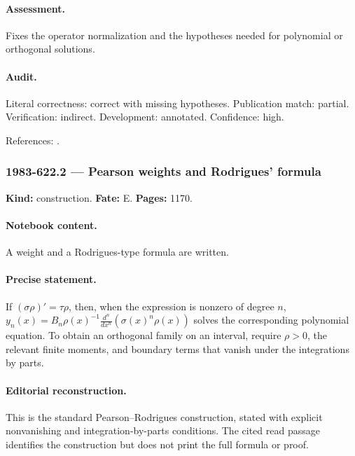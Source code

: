 \paragraph{Assessment.} Fixes the operator normalization and the hypotheses needed for polynomial or orthogonal solutions.

\paragraph{Audit.} Literal correctness: correct with missing hypotheses. Publication match: partial. Verification: indirect. Development: annotated. Confidence: high.

\noindent References: \citep{nikiforovsuslovuvarov1991classical}.\par

\subsubsection{1983-622.2 --- Pearson weights and Rodrigues’ formula}

\label{item:1983-622.2}

\noindent\textbf{Kind:} construction. \textbf{Fate:} E. \textbf{Pages:} 1170.\par

\paragraph{Notebook content.} A weight and a Rodrigues-type formula are written.

\paragraph{Precise statement.} If \((\sigma\rho)'=\tau\rho\), then, when the expression is nonzero of degree \(n\), \(y_n(x)=B_n\rho(x)^{-1}\frac{d^n}{dx^n}(\sigma(x)^n\rho(x))\) solves the corresponding polynomial equation. To obtain an orthogonal family on an interval, require \(\rho>0\), the relevant finite moments, and boundary terms that vanish under the integrations by parts.

\paragraph{Editorial reconstruction.} This is the standard Pearson–Rodrigues construction, stated with explicit nonvanishing and integration-by-parts conditions. The cited read passage identifies the construction but does not print the full formula or proof.

